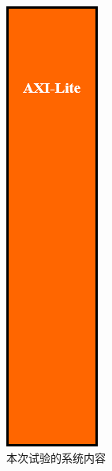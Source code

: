 \documentclass{ctexart}
\begin{document}
\begin{figure}
\centering
\includegraphics[width=1\linewidth]{report4-1}
\caption{本次试验的系统内容}
\label{fig:report4-1}
\end{figure}
\end{document}

